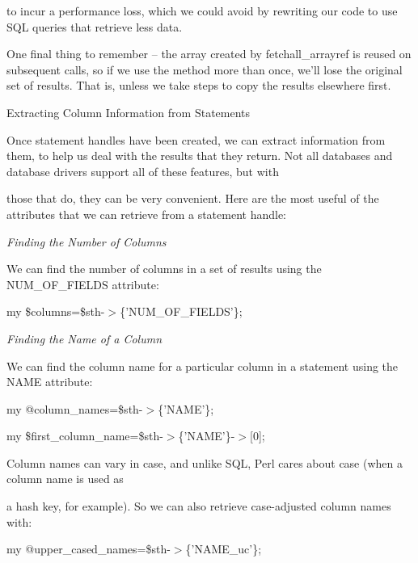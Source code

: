 \documentclass[a4paper,11pt]{book}
\begin{document}
\noindent to incur a performance loss, which we could avoid by rewriting our code to use SQL queries that retrieve less data.

\noindent 

\noindent One final thing to remember -- the array created by fetchall\_arrayref is reused on subsequent calls, so if we use the method more than once, we'll lose the original set of results. That is, unless we take steps to copy the results elsewhere first.

\noindent 

\noindent Extracting Column Information from Statements

\noindent 

\noindent Once statement handles have been created, we can extract information from them, to help us deal with the results that they return. Not all databases and database drivers support all of these features, but with

\noindent those that do, they can be very convenient. Here are the most useful of the attributes that we can retrieve from a statement handle:

\noindent 

\noindent 

\noindent \textit{Finding the Number of Columns}

\noindent We can find the number of columns in a set of results using the NUM\_OF\_FIELDS attribute:

\noindent 

\noindent my \$columns=\$sth-$>$\{'NUM\_OF\_FIELDS'\};

\noindent 

\noindent \textit{Finding the Name of a Column}

\noindent We can find the column name for a particular column in a statement using the NAME attribute:

\noindent 

\noindent my @column\_names=\$sth-$>$\{'NAME'\};

\noindent my \$first\_column\_name=\$sth-$>$\{'NAME'\}-$>$[0];

\noindent 

\noindent Column names can vary in case, and unlike SQL, Perl cares about case (when a column name is used as

\noindent a hash key, for example). So we can also retrieve case-adjusted column names with:

\noindent 

\noindent my @upper\_cased\_names=\$sth-$>$\{'NAME\_uc'\};
\end{document}
